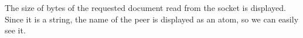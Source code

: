 \documentclass{ozdoc}
\begin{document}
The size of bytes of the requested document  read from the socket is displayed. Since it is a string, the name of the peer  is displayed as an atom, so we can easily see it.  \mozartEMPTY
 \mozartEMPTY



 \mozartEMPTY
\begin{mozartCODEDISPLAY}\mozartFACETEXT{\mozartNEWLINE
}\mozartFACETEXT{\mozartSPACE{}}\mozartFACETEXT{\mozartSPACE{}\mozartSPACE{}\mozartSPACE{}\mozartNEWLINE
}
\end{mozartCODEDISPLAY}
\end{document}

